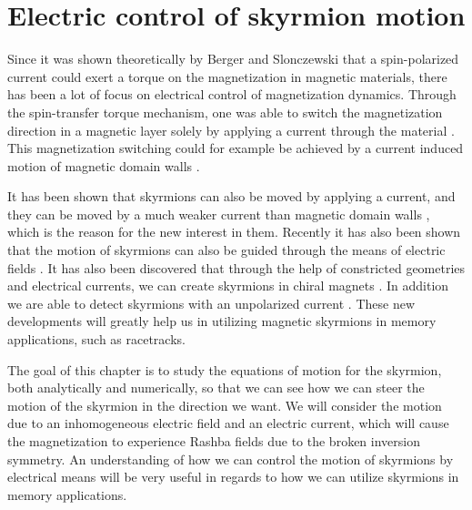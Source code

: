 \chapter{Electric control of skyrmion motion} \label{chap:SkyrmionDynamics}
Since it was shown theoretically by Berger \cite{Berger1978,Berger1984,Berger1992,Berger1996} and Slonczewski \cite{Slonczewski1996} that a spin-polarized current could exert a torque on the magnetization in magnetic materials, there has been a lot of focus on electrical control of magnetization dynamics. Through the spin-transfer torque mechanism, one was able to switch the magnetization direction in a magnetic layer solely by applying a current through the material \cite{Myers1999,Sun1999,Katine2000}. This magnetization switching could for example be achieved by a current induced motion of magnetic domain walls \cite{Yamanouchi2004,Yamaguchi2004,Saitoh2004,Yamanouchi2006}. 

It has been shown that skyrmions can also be moved by applying a current, and they can be moved by a much weaker current than magnetic domain walls \cite{Jonietz2010,Yu2012}, which is the reason for the new interest in them. Recently it has also been shown that the motion of skyrmions can also be guided through the means of electric fields \cite{Upadhyaya2015}. It has also been discovered that through the help of constricted geometries and electrical currents, we can create skyrmions in chiral magnets \cite{Iwasaki2013,Sampaio2013,Jiang2015}. In addition we are able to detect skyrmions with an unpolarized current \cite{Monchesky2015}. These new developments will greatly help us in utilizing magnetic skyrmions in memory applications, such as racetracks. 

The goal of this chapter is to study the equations of motion for the skyrmion, both analytically and numerically, so that we can see how we can steer the motion of the skyrmion in the direction we want. We will consider the motion due to an inhomogeneous electric field and an electric current, which will cause the magnetization to experience Rashba fields due to the broken inversion symmetry. An understanding of how we can control the motion of skyrmions by electrical means will be very useful in regards to how we can utilize skyrmions in memory applications.
